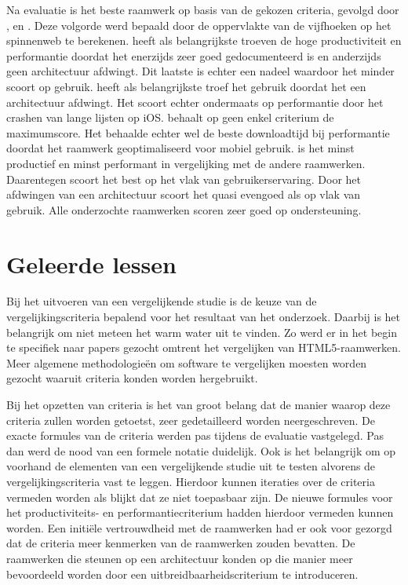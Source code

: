 Na evaluatie is \jqm{} het beste raamwerk op basis van de gekozen criteria, gevolgd door \kendo{}, \lungo{} en \st{}.
Deze volgorde werd bepaald door de oppervlakte van de vijfhoeken op het spinnenweb te berekenen.
\jqm{} heeft als belangrijkste troeven de hoge productiviteit en performantie doordat het enerzijds zeer goed gedocumenteerd is en anderzijds geen architectuur afdwingt.
Dit laatste is echter een nadeel waardoor het minder scoort op gebruik.
\kendo{} heeft als belangrijkste troef het gebruik doordat het een architectuur afdwingt.
Het scoort echter ondermaats op performantie door het crashen van lange lijsten op iOS.
\lungo{} behaalt op geen enkel criterium de maximumscore.
Het behaalde echter wel de beste downloadtijd bij performantie doordat het raamwerk geoptimaliseerd voor mobiel gebruik.
\st{} is het minst productief en minst performant in vergelijking met de andere raamwerken.
Daarentegen scoort \st{} het best op het vlak van gebruikerservaring.
Door het afdwingen van een architectuur scoort het quasi evengoed als \kendo{} op vlak van gebruik.
Alle onderzochte raamwerken scoren zeer goed op ondersteuning.


\section{Geleerde lessen} %
Bij het uitvoeren van een vergelijkende studie is de keuze van de vergelijkingscriteria bepalend voor het resultaat van het onderzoek.
Daarbij is het belangrijk om niet meteen het warm water uit te vinden.
Zo werd er in het begin te specifiek naar papers gezocht omtrent het vergelijken van HTML5-raamwerken.
Meer algemene methodologieën om software te vergelijken moesten worden gezocht waaruit criteria konden worden hergebruikt.

Bij het opzetten van criteria is het van groot belang dat de manier waarop deze criteria zullen worden getoetst, zeer gedetailleerd worden neergeschreven.
De exacte formules van de criteria werden pas tijdens de evaluatie vastgelegd.
Pas dan werd de nood van een formele notatie duidelijk.
Ook is het belangrijk om op voorhand de elementen van een vergelijkende studie uit te testen alvorens de vergelijkingscriteria vast te leggen.
Hierdoor kunnen iteraties over de criteria vermeden worden als blijkt dat ze niet toepasbaar zijn.
De nieuwe formules voor het productiviteits- en performantiecriterium hadden hierdoor vermeden kunnen worden.
Een initiële vertrouwdheid met de raamwerken had er ook voor gezorgd dat de criteria meer kenmerken van de raamwerken zouden bevatten.
De raamwerken die steunen op een architectuur konden op die manier meer bevoordeeld worden door een uitbreidbaarheidscriterium te introduceren.

